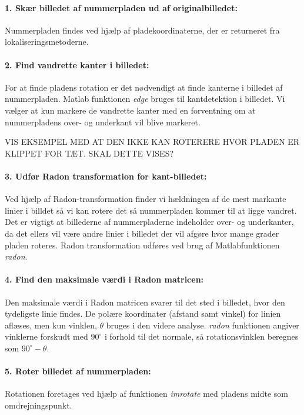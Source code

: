 \paragraph{1. Skær billedet af nummerpladen ud af originalbilledet:}
Nummerpladen findes ved hjælp af pladekoordinaterne, der er returneret fra lokaliseringsmetoderne.

\paragraph{2. Find vandrette kanter i billedet:}
For at finde pladens rotation er det nødvendigt at finde kanterne i billedet af nummerpladen. Matlab funktionen \textit{edge} bruges til kantdetektion i billedet. Vi vælger at kun markere de vandrette kanter med en forventning om at nummerpladens over- og underkant vil blive markeret.

VIS EKSEMPEL MED AT DEN IKKE KAN ROTERERE HVOR PLADEN ER KLIPPET FOR TÆT. SKAL DETTE VISES?

\paragraph{3. Udfør Radon transformation for kant-billedet:}
Ved hjælp af Radon-transformation finder vi hældningen af de mest markante linier i billdet så vi kan rotere det så nummerpladen kommer til at ligge vandret. Det er vigtigt at billederne af nummerpladerne indeholder over- og underkanter, da det ellers vil være andre linier i billedet der vil afgøre hvor mange grader pladen roteres. Radon transformation udføres ved brug af Matlabfunktionen \textit{radon}.

\paragraph{4. Find den maksimale værdi i Radon matricen:} Den maksimale værdi i Radon matricen svarer til det sted i billedet, hvor den tydeligste linie findes. De polære koordinater (afstand samt vinkel) for linien aflæses, men kun vinklen, $\theta$ bruges i den videre analyse. \textit{radon} funktionen angiver vinklerne forskudt med $90^{\circ}$ i forhold til det normale, så rotationsvinklen beregnes som $90^{\circ} - \theta$.

\paragraph{5. Roter billedet af nummerpladen:} Rotationen foretages ved hjælp af funktionen \textit{imrotate} med pladens midte som omdrejningspunkt.

